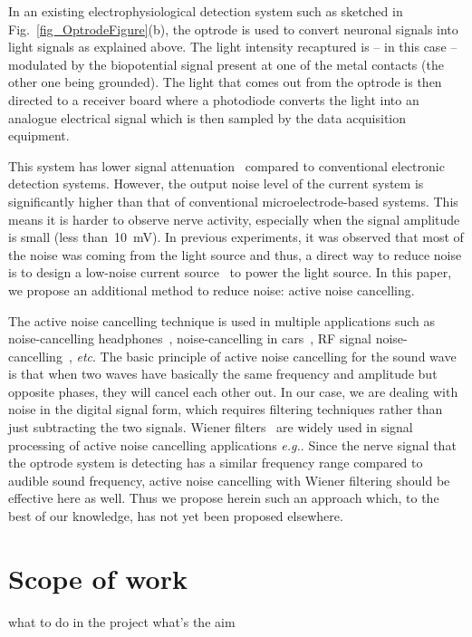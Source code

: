 In an existing electrophysiological  detection system such as sketched in Fig.~\ref{fig_OptrodeFigure}(b), the optrode is used to convert neuronal signals into light signals as explained above.  The light intensity recaptured is -- in this case -- modulated by the biopotential signal present at one of the metal contacts (the other one being grounded). The light that comes out from the optrode is then directed to a receiver board where a photodiode converts the light into an analogue electrical signal which is then sampled by the data acquisition equipment.

This system has lower signal attenuation~\cite{OptrodeArray,ImpedanceOfOptrode} compared to conventional electronic detection systems. However, the output noise level of the current system is significantly higher than that of conventional microelectrode-based systems. This means it is harder to observe nerve activity, especially when the signal amplitude is small (less than~\qty{10}{mV}).  In previous experiments, it was observed that most of the noise was coming from the light source and thus, a direct way to reduce noise is to design a low-noise current source~\cite{LowNoiseCurrentSource} to power the light source.  In this paper, we propose an additional method to reduce noise: active noise cancelling.

The active noise cancelling technique is used in multiple applications such as noise-cancelling headphones~\cite{ANC_Headphone_1,ANC_Headphone_2}, noise-cancelling in cars~\cite{ANC_Car}, RF signal noise-cancelling~\cite{ANC_RF}, {\em etc}.  The basic principle of active noise cancelling for the sound wave is that when two waves have basically the same frequency and amplitude but opposite phases, they will cancel each other out.  In our case, we are dealing with noise in the digital signal form, which requires filtering techniques rather than just subtracting the two signals.  Wiener filters~\cite{WienerFilter} are widely used in signal processing of active noise cancelling applications {\em e.g.}\cite{ANC_Wiener_2,ANC_Wiener_3}.  Since the nerve signal that the optrode system is detecting has a similar frequency range compared to audible sound frequency, active noise cancelling with Wiener filtering should be effective here as well. Thus we propose herein such an approach which, to the best of our knowledge, has not yet been proposed elsewhere.


\section{Scope of work}

what to do in the project
what's the aim
